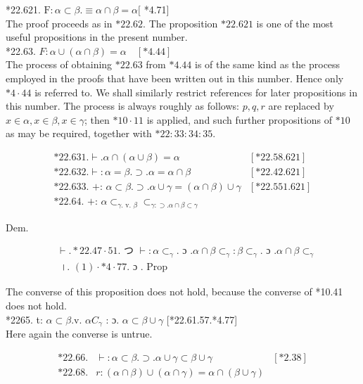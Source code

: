 \documentclass[10pt]{article}
\begin{document}
*22.621. $\mathrm{F}: \alpha \subset \beta . \equiv \alpha \cap \beta=\alpha[$ *4.71]\\
The proof proceeds as in $* 22.62$. The proposition $* 22.621$ is one of the most useful propositions in the present number.\\
*22.63. $F: \alpha \cup(\alpha \cap \beta)=\alpha \quad[* 4.44]$\\
The process of obtaining $* 22.63$ from $* 4.44$ is of the same kind as the process employed in the proofs that have been written out in this number. Hence only $* 4 \cdot 44$ is referred to. We shall similarly restrict references for later propositions in this number. The process is always roughly as follows: $p, q, r$ are replaced by $x \in \alpha, x \in \beta, x \in \gamma$; then $* 10 \cdot 11$ is applied, and such further propositions of $* 10$ as may be required, together with $* 22: 33: 34: 35$.

$$
\begin{array}{ll}
* 22.631 . \vdash . \alpha \cap(\alpha \cup \beta)=\alpha & {[* 22.58 .621]} \\
* 22.632 . \vdash: \alpha=\beta . \supset . \alpha=\alpha \cap \beta & {[* 22.42 .621]} \\
* 22.633 . \text { +: } \alpha \subset \beta . \supset . \alpha \cup \gamma=(\alpha \cap \beta) \cup \gamma & {[* 22.551 .621]} \\
* 22.64 . \text { +: } \alpha \subset_{\gamma . \text { v. } \beta} \subset_{\gamma: \supset . \alpha \cap \beta \subset \gamma} &
\end{array}
$$

Dem.


\begin{align*}
& \vdash . * 22.47 \cdot 51 . \text { つ } \vdash: \alpha \subset_{\gamma} . \text { ɔ } . \alpha \cap \beta \subset_{\gamma}: \beta \subset_{\gamma} . \text { ɔ } . \alpha \cap \beta \subset_{\gamma}  \tag{1}\\
& \text { ।. }(1) \cdot * 4 \cdot 77 . \text { ɔ } \text {. Prop }
\end{align*}


The converse of this proposition does not hold, because the converse of *10.41 does not hold.\\
*2265. t: $\alpha \subset \beta$.v. $\alpha C_{\gamma}$ : ɔ. $\alpha \subset \beta \cup \gamma$ [*22.61.57.*4.77]\\
Here again the converse is untrue.

$$
\begin{array}{lll}
* 22.66 . & \vdash: \alpha \subset \beta . \supset . \alpha \cup \gamma \subset \beta \cup \gamma & {[* 2.38]} \\
* 22.68 . & r:(\alpha \cap \beta) \cup(\alpha \cap \gamma)=\alpha \cap(\beta \cup \gamma) &
\end{array}
$$
\end{document}
